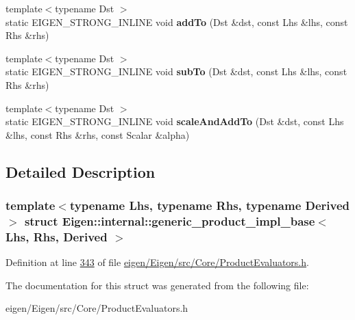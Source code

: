 \begin{DoxyCompactItemize}
\item 
\mbox{\label{struct_eigen_1_1internal_1_1generic__product__impl__base_ab7918338c4d9526139bc891a96ee9ae0}} 
{\footnotesize template$<$typename Dst $>$ }\\static E\+I\+G\+E\+N\+\_\+\+S\+T\+R\+O\+N\+G\+\_\+\+I\+N\+L\+I\+NE void {\bfseries add\+To} (Dst \&dst, const Lhs \&lhs, const Rhs \&rhs)
\item 
\mbox{\label{struct_eigen_1_1internal_1_1generic__product__impl__base_a30e06eff6da25a65944a59070271174c}} 
{\footnotesize template$<$typename Dst $>$ }\\static E\+I\+G\+E\+N\+\_\+\+S\+T\+R\+O\+N\+G\+\_\+\+I\+N\+L\+I\+NE void {\bfseries sub\+To} (Dst \&dst, const Lhs \&lhs, const Rhs \&rhs)
\item 
\mbox{\label{struct_eigen_1_1internal_1_1generic__product__impl__base_a7312930df275f11db3fc4388c3e1819e}} 
{\footnotesize template$<$typename Dst $>$ }\\static E\+I\+G\+E\+N\+\_\+\+S\+T\+R\+O\+N\+G\+\_\+\+I\+N\+L\+I\+NE void {\bfseries scale\+And\+Add\+To} (Dst \&dst, const Lhs \&lhs, const Rhs \&rhs, const Scalar \&alpha)
\end{DoxyCompactItemize}


\subsection{Detailed Description}
\subsubsection*{template$<$typename Lhs, typename Rhs, typename Derived$>$\newline
struct Eigen\+::internal\+::generic\+\_\+product\+\_\+impl\+\_\+base$<$ Lhs, Rhs, Derived $>$}



Definition at line \hyperlink{eigen_2_eigen_2src_2_core_2_product_evaluators_8h_source_l00343}{343} of file \hyperlink{eigen_2_eigen_2src_2_core_2_product_evaluators_8h_source}{eigen/\+Eigen/src/\+Core/\+Product\+Evaluators.\+h}.



The documentation for this struct was generated from the following file\+:\begin{DoxyCompactItemize}
\item 
eigen/\+Eigen/src/\+Core/\+Product\+Evaluators.\+h\end{DoxyCompactItemize}
